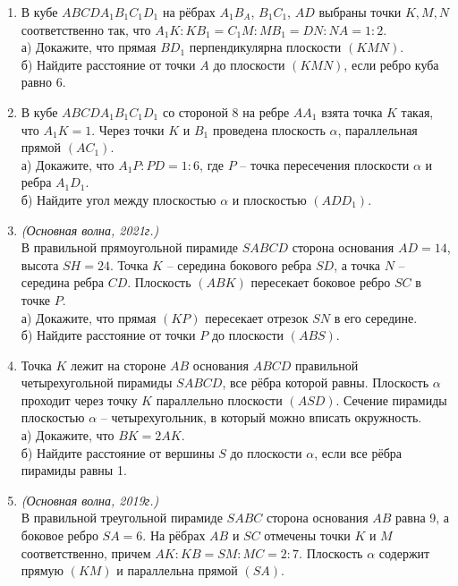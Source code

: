 \documentclass[12pt]{article}
\begin{document}
    \begin{enumerate}[start=1,label={\itshape\bfseries \arabic*.}]
        \item  В кубе $ABCD A_1 B_1 C_1 D_1$ на рёбрах $A_1 B_A$, $B_1 C_1$, $AD$ выбраны точки $K, M, N$ соответственно так, что $A_1 K : K B_1 = C_1 M : M B_1 = DN : NA = 1 : 2$.\\
        а) Докажите, что прямая $B D_1$ перпендикулярна плоскости $(KMN)$.\\
        б) Найдите расстояние от точки $A$ до плоскости $(KMN)$, если ребро куба равно 6.
        \item В кубе $ABCD A_1 B_1 C_1 D_1$ со стороной 8 на ребре $A A_1$ взята точка $K$ такая, что $A_1 K = 1$. Через точки $K$ и $B_1$ проведена плоскость $\alpha$, параллельная прямой $(A C_1)$.\\
        а) Докажите, что $A_1 P : PD = 1 : 6$, где $P$ -- точка пересечения плоскости $\alpha$ и ребра $A_1 D_1$.\\
        б) Найдите угол между плоскостью $\alpha$ и плоскостью $(A D D_1)$.
        \item \textit{(Основная волна, 2021г.)}\\
        В правильной прямоугольной пирамиде $SABCD$ сторона основания $AD = 14$, высота $SH = 24$. Точка $K$ -- середина бокового ребра $SD$, а точка $N$ -- середина ребра $CD$. Плоскость $(ABK)$ пересекает боковое ребро $SC$ в точке $P$.\\
        а) Докажите, что прямая $(KP)$ пересекает отрезок $SN$ в его середине.\\
        б) Найдите расстояние от точки $P$ до плоскости $(ABS)$.
        \item Точка $K$ лежит на стороне $AB$ основания $ABCD$ правильной четырехугольной пирамиды $SABCD$, все рёбра которой равны. Плоскость  $\alpha$ проходит через точку $K$ параллельно плоскости $(ASD)$. Сечение пирамиды плоскостью $\alpha$ -- четырехугольник, в который можно вписать окружность. \\
        а) Докажите, что $BK = 2AK$.\\
        б) Найдите расстояние от вершины $S$ до плоскости $\alpha$, если все рёбра пирамиды равны 1.
        \item \textit{(Основная волна, 2019г.)}\\
        В правильной треугольной пирамиде $SABC$ сторона основания $AB$ равна 9, а боковое ребро $SA = 6$. На рёбрах $AB$ и $SC$ отмечены точки $K$ и $M$ соответственно, причем $AK : KB = SM :  MC = 2 : 7$. Плоскость $\alpha$ содержит прямую $(KM)$ и параллельна прямой $(SA)$.\\

\end{enumerate}
\end{document}
